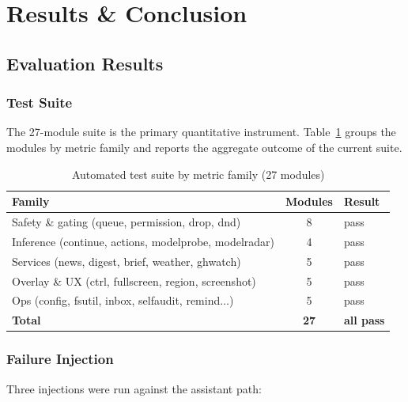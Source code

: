 
\section{Results \& Conclusion}

\subsection{Evaluation Results}

\subsubsection{Test Suite}

The 27-module suite is the primary quantitative instrument.
Table~\ref{tab:tests} groups the modules by metric family and
reports the aggregate outcome of the current suite.

\begin{table}[t]
\centering\small
\caption{Automated test suite by metric family (27 modules)}
\label{tab:tests}
\begin{tabular}{@{}p{}c@{\qquad}p{}@{}}
\toprule
\textbf{Family} & \textbf{Modules} & \textbf{Result} \\
\midrule
Safety \& gating (queue, permission, drop, dnd) & 8 & pass \\
Inference (continue, actions, modelprobe, modelradar) & 4 & pass \\
Services (news, digest, brief, weather, ghwatch) & 5 & pass \\
Overlay \& UX (ctrl, fullscreen, region, screenshot) & 5 & pass \\
Ops (config, fsutil, inbox, selfaudit, remind$\ldots$) & 5 & pass \\
\midrule
\textbf{Total} & \textbf{27} & \textbf{all pass} \\
\bottomrule
\end{tabular}
\end{table}

\subsubsection{Failure Injection}

Three injections were run against the assistant path:

